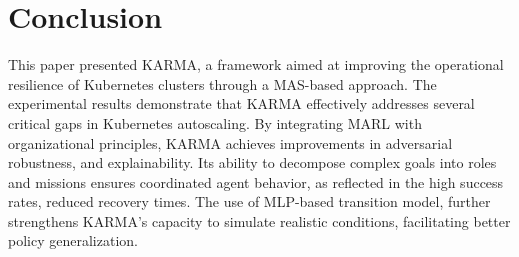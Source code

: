 \documentclass[conference]{IEEEtran}
\begin{document}

\section{Conclusion}
\label{sec:conclusion}

This paper presented KARMA, a framework aimed at improving the operational resilience of Kubernetes clusters through a MAS-based approach.
The experimental results demonstrate that KARMA effectively addresses several critical gaps in Kubernetes autoscaling. By integrating MARL with organizational principles, KARMA achieves improvements in adversarial robustness, and explainability. Its ability to decompose complex goals into roles and missions ensures coordinated agent behavior, as reflected in the high success rates, reduced recovery times. The use of MLP-based transition model, further strengthens KARMA's capacity to simulate realistic conditions, facilitating better policy generalization.
%
%
\end{document}
